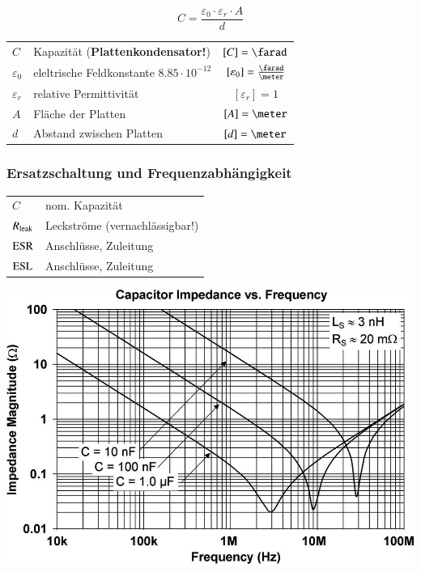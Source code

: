 \begin{minipage}[c]{0.20\columnwidth}
    $$ \boxed{C = \frac{\varepsilon_0 \cdot \varepsilon_r \cdot A}{d}} $$
\end{minipage}
\hfill
\begin{minipage}[c]{0.78\columnwidth}
    \begin{tabular}{llc}
        $C$             & Kapazität (\textbf{Plattenkondensator!})          & $[C] = \farad$ \\
        $\varepsilon_0$ & eleltrische Feldkonstante $8.85 \cdot 10^{-12}$   & $[\varepsilon_0] = \frac{\farad}{\meter}$ \\
        $\varepsilon_r$ & relative Permittivität                            & $[\varepsilon_r] = 1$ \\
        $A$             & Fläche der Platten                                & $[A] = \meter$ \\
        $d$             & Abstand zwischen Platten                          & $[d] = \meter$
    \end{tabular}
\end{minipage}


\subsubsection{Ersatzschaltung und Frequenzabhängigkeit}

\begin{minipage}[c]{0.48\columnwidth}
    

    \begin{tabular}{ll@{}}
        $C$             & nom. Kapazität  \\
        $R_{\rm leak}$  & Leckströme (vernachlässigbar!) \\
        $\rm{ESR}$      & Anschlüsse, Zuleitung \\ 
        $\rm{ESL}$      & Anschlüsse, Zuleitung 
    \end{tabular}
\end{minipage}
\hfill
\begin{minipage}[c]{0.5\columnwidth}
    \includegraphics[width=\columnwidth]{images/realer_kondensator_frequenzverlauf.jpg}
\end{minipage}

